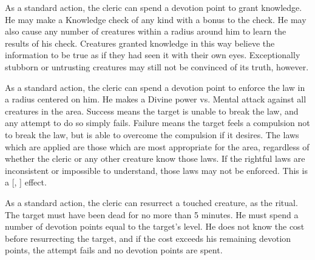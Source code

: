     As a standard action, the cleric can spend a devotion point to grant knowledge.
    He may make a Knowledge check of any kind with a  bonus to the check.
    He may also cause any number of creatures within a \arealarge radius around him to learn the results of his check.
    Creatures granted knowledge in this way believe the information to be true as if they had seen it with their own eyes.
    Exceptionally stubborn or untrusting creatures may still not be convinced of its truth, however.

    As a standard action, the cleric can spend a devotion point to enforce the law in a \arealarge radius  centered on him.
    He makes a Divine power vs. Mental attack against all creatures in the area.
    Success means the target is unable to break the law, and any attempt to do so simply fails.
    Failure means the target feels a compulsion not to break the law, but is able to overcome the compulsion if it desires.
    The laws which are applied are those which are most appropriate for the area, regardless of whether the cleric or any other creature know those laws.
    If the rightful laws are inconsistent or impossible to understand, those laws may not be enforced.
    This is a [, ] effect.

    As a standard action, the cleric can resurrect a touched creature, as the  ritual.
    The target must have been dead for no more than 5 minutes.
    He must spend a number of devotion points equal to the target's level.
    He does not know the cost before resurrecting the target, and if the cost exceeds his remaining devotion points, the attempt fails and no devotion points are spent.

